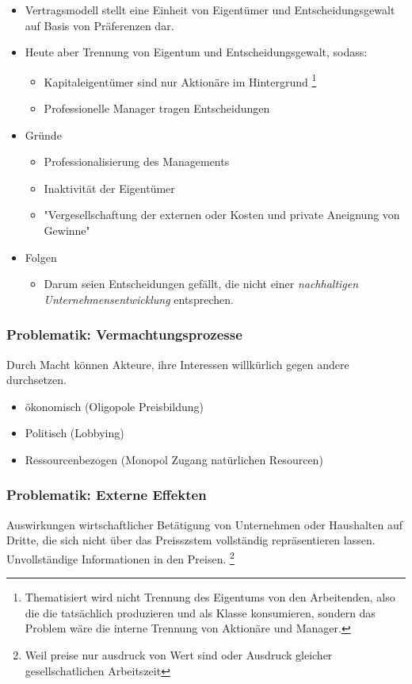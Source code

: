 \begin{itemize}
    \item Vertragsmodell stellt eine Einheit von Eigentümer und Entscheidungsgewalt auf Basis von Präferenzen dar.
    \item Heute aber Trennung von Eigentum und Entscheidungsgewalt, sodass:
    \begin{itemize}
        \item Kapitaleigentümer sind nur Aktionäre im Hintergrund \footnote{Thematisiert wird nicht Trennung des Eigentums von den Arbeitenden, also die die tatsächlich produzieren und als Klasse konsumieren, sondern das Problem wäre die interne Trennung von Aktionäre und Manager.}
        \item Professionelle Manager tragen Entscheidungen
    \end{itemize}
    \item Gründe
    \begin{itemize}
        \item Professionalisierung des Managements
        \item Inaktivität der Eigentümer
        \item "Vergesellschaftung der externen  oder Kosten und private Aneignung von Gewinne"
    \end{itemize}  
    \item Folgen
    \begin{itemize}
        \item Darum seien Entscheidungen gefällt, die nicht einer \textit{nachhaltigen Unternehmensentwicklung} entsprechen.
    \end{itemize}
\end{itemize}


\pagebreak
\subsubsection{Problematik: Vermachtungsprozesse}
Durch Macht können Akteure, ihre Interessen willkürlich gegen andere durchsetzen. 

\begin{itemize}
    \item ökonomisch (Oligopole Preisbildung)
    \item Politisch (Lobbying)
    \item Ressourcenbezogen (Monopol Zugang natürlichen Resourcen)
\end{itemize}

\subsubsection{Problematik: Externe Effekten}
\begin{definition}
     Auswirkungen wirtschaftlicher Betätigung von Unternehmen oder Haushalten auf Dritte, die sich nicht über das Preisszstem vollständig repräsentieren lassen. Unvollständige Informationen in den Preisen. \footnote{Weil preise nur ausdruck von Wert sind oder Ausdruck gleicher gesellschatlichen Arbeitszeit}  
\end{definition}
